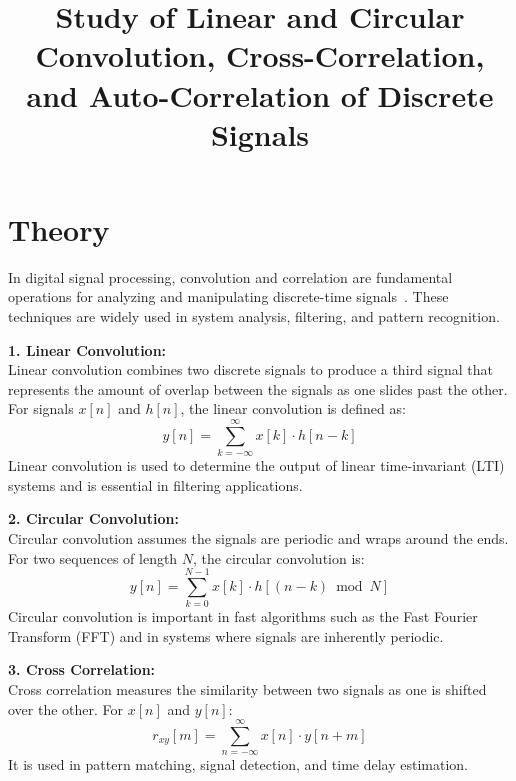 \documentclass[11pt]{article}
\title{Study of Linear and Circular Convolution, Cross-Correlation, and Auto-Correlation of Discrete Signals}
\author{}
\date{}
\begin{document}


\pagebreak

\tableofcontents

\pagebreak
{}
\maketitle

\section*{Theory}
In digital signal processing, convolution and correlation are fundamental operations for analyzing and manipulating discrete-time signals~\cite{salivahanan_dsp, proakis_dsp, jervis_dsp}. These techniques are widely used in system analysis, filtering, and pattern recognition.

\textbf{1. Linear Convolution:} \\
Linear convolution combines two discrete signals to produce a third signal that represents the amount of overlap between the signals as one slides past the other. For signals $x[n]$ and $h[n]$, the linear convolution is defined as:
\begin{equation}
    y[n] = \sum_{k=-\infty}^{\infty} x[k] \cdot h[n-k]
\end{equation}
Linear convolution is used to determine the output of linear time-invariant (LTI) systems and is essential in filtering applications.

\textbf{2. Circular Convolution:} \\
Circular convolution assumes the signals are periodic and wraps around the ends. For two sequences of length $N$, the circular convolution is:
\begin{equation}
    y[n] = \sum_{k=0}^{N-1} x[k] \cdot h[(n-k) \bmod N]
\end{equation}
Circular convolution is important in fast algorithms such as the Fast Fourier Transform (FFT) and in systems where signals are inherently periodic.

\textbf{3. Cross Correlation:} \\
Cross correlation measures the similarity between two signals as one is shifted over the other. For $x[n]$ and $y[n]$:
\begin{equation}
    r_{xy}[m] = \sum_{n=-\infty}^{\infty} x[n] \cdot y[n+m]
\end{equation}
It is used in pattern matching, signal detection, and time delay estimation.
\end{document}
